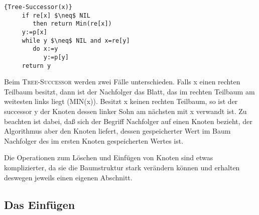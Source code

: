 \documentclass[ngerman,draft,parskip=half*,twoside]{scrreprt}
\theoremstyle{break}
\theoremstyle{nonumberbreak}
\begin{document}
   \begin{Algorithmus}[H]
    \begin{lstlisting}[frame=tlrb, mathescape=true, title=\textsc{Tree-Successor\textnormal{(x)}}, gobble=4]{Tree-Successor(x)}
     if re[x] $\neq$ NIL
        then return Min(re[x])
     y:=p[x]
     while y $\neq$ NIL and x=re[y]
        do x:=y
           y:=p[y]
     return y
    \end{lstlisting}

   Beim \textsc{Tree-Successor} werden zwei Fälle unterschieden. Falls x 
   einen rechten Teilbaum besitzt, dann ist der Nachfolger das Blatt, das im 
   rechten Teilbaum am weitesten links liegt (\textsc{MIN}(x)). Besitzt x keinen 
   rechten Teilbaum, so ist der successor y der Knoten dessen linker Sohn 
   am nächsten mit x verwandt ist. Zu beachten ist dabei, daß sich der Begriff Nachfolger auf einen Knoten bezieht, der Algorithmus
   aber den Knoten liefert, dessen gespeicherter Wert im Baum Nachfolger des im ersten Knoten gespeicherten Wertes ist. 
   \end{Algorithmus}
   
Die Operationen zum Löschen und Einfügen von Knoten sind etwas komplizierter, da sie die Baumstruktur stark verändern können und
erhalten deswegen jeweils einen eigenen Abschnitt.
\subsection{Das Einfügen}
\end{document}
